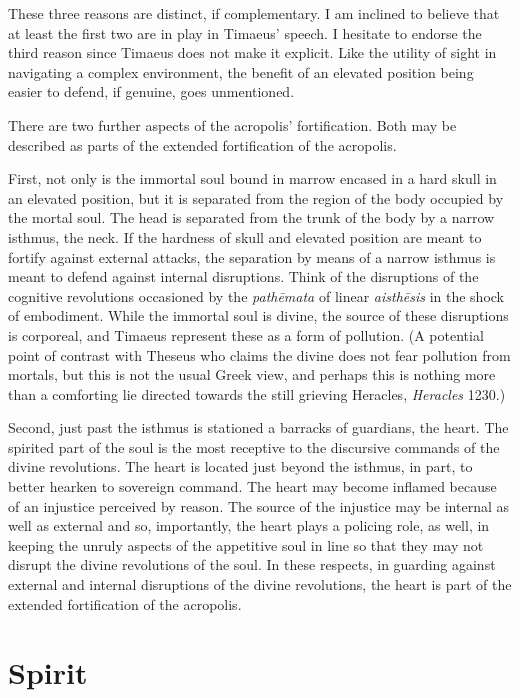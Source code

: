 These three reasons are distinct, if complementary. I am inclined to believe that at least the first two are in play in Timaeus' speech.  I hesitate to endorse the third reason since Timaeus does not make it explicit. Like the utility of sight in navigating a complex environment, the benefit of an elevated position being easier to defend, if genuine, goes unmentioned.

There are two further aspects of the acropolis' fortification. Both may be described as parts of the extended fortification of the acropolis.

First, not only is the immortal soul bound in marrow encased in a hard skull in an elevated position, but it is separated from the region of the body occupied by the mortal soul. The head is separated from the trunk of the body by a narrow isthmus, the neck. If the hardness of skull and elevated position are meant to fortify against external attacks, the separation by means of a narrow isthmus is meant to defend against internal disruptions. Think of the disruptions of the cognitive revolutions occasioned by the \emph{pathēmata} of linear \emph{aisthēsis} in the shock of embodiment. While the immortal soul is divine, the source of these disruptions is corporeal, and Timaeus represent these as a form of pollution. (A potential point of contrast with Theseus who claims the divine does not fear pollution from mortals, but this is not the usual Greek view, and perhaps this is nothing more than a comforting lie directed towards the still grieving Heracles, \emph{Heracles} 1230.)

Second, just past the isthmus is stationed a barracks of guardians, the heart. The spirited part of the soul is the most receptive to the discursive commands of the divine revolutions. The heart is located just beyond the isthmus, in part, to better hearken to sovereign command. The heart may become inflamed because of an injustice perceived by reason. The source of the injustice may be internal as well as external and so, importantly, the heart plays a policing role, as well, in keeping the unruly aspects of the appetitive soul in line so that they may not disrupt the divine revolutions of the soul. In these respects, in guarding against external and internal disruptions of the divine revolutions, the heart is part of the extended fortification of the acropolis.


\section{Spirit} %
\label{sec:spirit}

